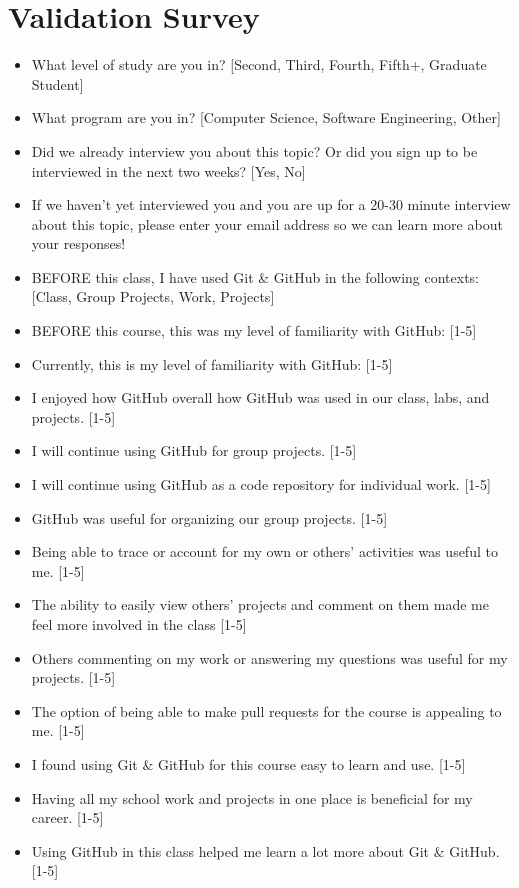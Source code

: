 \section{Validation Survey}
\begin{itemize}
    \item What level of study are you in? [Second, Third, Fourth, Fifth+, Graduate Student]
    \item What program are you in? [Computer Science, Software Engineering, Other]
    \item Did we already interview you about this topic? Or did you sign up to be interviewed in the next two weeks? [Yes, No]
    \item If we haven't yet interviewed you and you are up for a 20-30 minute interview about this topic, please enter your email address so we can learn more about your responses!
    \item BEFORE this class, I have used Git \& GitHub in the following contexts: [Class, Group Projects, Work, Projects]
    \item BEFORE this course, this was my level of familiarity with GitHub: [1-5]
    \item Currently, this is my level of familiarity with GitHub: [1-5]
    \item I enjoyed how GitHub overall how GitHub was used in our class, labs, and projects. [1-5]
    \item I will continue using GitHub for group projects. [1-5]
    \item I will continue using GitHub as a code repository for individual work. [1-5]
    \item GitHub was useful for organizing our group projects. [1-5]
    \item Being able to trace or account for my own or others' activities was useful to me. [1-5]
    \item The ability to easily view others' projects and comment on them made me feel more involved in the class [1-5]
    \item Others commenting on my work or answering my questions was useful for my projects. [1-5]
    \item The option of being able to make pull requests for the course is appealing to me. [1-5]
    \item I found using Git \& GitHub for this course easy to learn and use. [1-5]
    \item Having all my school work and projects in one place is beneficial for my career. [1-5]
    \item Using GitHub in this class helped me learn a lot more about Git \& GitHub. [1-5]

\end{itemize}
